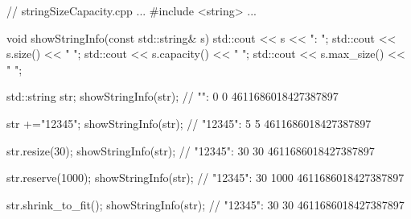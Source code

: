 \begin{cpp}
// stringSizeCapacity.cpp
...
#include <string>
...

void showStringInfo(const std::string& s){
	std::cout << s << ": ";
	std::cout << s.size() << " ";
	std::cout << s.capacity() << " ";
	std::cout << s.max_size() << " ";
}

std::string str;
showStringInfo(str); // "": 0 0 4611686018427387897

str +="12345";
showStringInfo(str); // "12345": 5 5 4611686018427387897

str.resize(30);
showStringInfo(str); // "12345": 30 30 4611686018427387897

str.reserve(1000);
showStringInfo(str); // "12345": 30 1000 4611686018427387897

str.shrink_to_fit();
showStringInfo(str); // "12345": 30 30 4611686018427387897
\end{cpp}










































